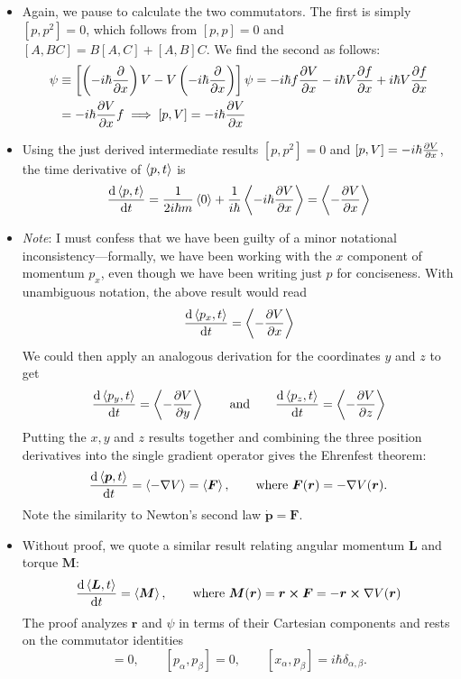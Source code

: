 \documentclass[11pt, a4paper]{article}
\renewcommand{\grad}{\nabla}
\newcommand{\eqtext}[1]{\qquad \text{#1} \qquad}
\renewcommand{\vec}[1]{\bm{#1}} %
\renewcommand{\r}{\vec{r}}  %
\newcommand{\p}{\psi}  %
\begin{document}
\begin{itemize}
	\item Again, we pause to calculate the two commutators. The first is simply $ [p, p^{2}] = 0 $, which follows from $ [p, p] = 0 $ and $ [A, BC] = B[A, C] + [A, B]C $. We find the second as follows:
	\begin{align*}
		[p, V]\p &\equiv \left[ \left(-i\hbar \pdv{x}\right) V - V\left(-i\hbar \pdv{x}\right) \right] \p = - i \hbar f \pdv{V}{x} - i \hbar V \pdv{f}{x} + i \hbar V \pdv{f}{x} \\
		& =  - i \hbar \pdv{V}{x}f \implies [p, V] = - i \hbar \pdv{V}{x}
	\end{align*}
	
	\item Using the just derived intermediate results $  [p, p^{2}] = 0 $  and $ [p, V] = - i \hbar \pdv{V}{x} $, the time derivative of $ \ev{p, t} $ is 
	\begin{equation*}
		\dv{\ev{p, t}}{t} = \frac{1}{2i \hbar m}\ev{0} + \frac{1}{i\hbar} \ev{- i \hbar \pdv{V}{x}} = \ev{-\pdv{V}{x}}
	\end{equation*}
	
	\item \textit{Note}: I must confess that we have been guilty of a minor notational inconsistency---formally, we have been working with the $ x $ component of momentum $ p_{x} $, even though we have been writing just $ p $ for conciseness. With unambiguous notation, the above result would read
	\begin{equation*}
		\dv{\ev{p_{x}, t}}{t} = \ev{-\pdv{V}{x}}
	\end{equation*}
	We could then apply an analogous derivation for the coordinates $ y $ and $ z $ to get
	\begin{equation*}
		\dv{\ev{p_{y}, t}}{t} = \ev{-\pdv{V}{y}} \eqtext{and} \dv{\ev{p_{z}, t}}{t} =  \ev{-\pdv{V}{z}}
	\end{equation*}
	Putting the $ x, y $ and $ z $ results together and combining the three position derivatives into the single gradient operator gives the Ehrenfest theorem:
	\begin{equation*}
		\dv{\ev{\vec{p}, t}}{t} = \ev{-\grad V} = \ev{\vec{F}}, \qquad \text{where } \vec{F}(\r) = - \grad V(\r).
	\end{equation*}
	Note the similarity to Newton's second law $ \dot{\vec{p}} = \vec{F} $.
	
	\item Without proof, we quote a similar result relating angular momentum $ \vec{L} $ and torque $ \vec{M} $:
	\begin{equation*}
		\dv{\ev{\vec{L}, t}}{t} = \ev{\vec{M}}, \qquad \text{where } \vec{M}(\r) = \r \cross \vec{F} = - \r \cross \grad V(\r)
	\end{equation*}
	The proof analyzes $ \r $ and $ \p $ in terms of their Cartesian components and rests on the commutator identities
	\begin{equation*}
		[x_{\alpha}, x_{\beta}] = 0, \qquad [p_{\alpha}, p_{\beta}] = 0, \qquad [x_{\alpha}, p_{\beta}] = i \hbar \delta_{\alpha, \beta}.
	\end{equation*}
	
\end{itemize}
\end{document}
